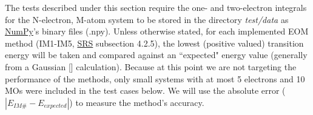 \documentclass[12pt, titlepage]{article}
\begin{document}
The tests described under this section require the one- and 
two-electron integrals for the N-electron, M-atom system to be stored in the 
directory \textit{test/data} as \href{https://numpy.org/} {NumPy}'s binary 
files (.npy). Unless otherwise 
stated, for each implemented EOM method (IM1-IM5, 
\href{https://github.com/gabrielasd/eomee/tree/cas741/docs/SRS} {SRS} 
subsection 4.2.5), the lowest (positive valued) 
transition energy will be taken and compared against an ``expected" energy 
value 
(generally from a Gaussian [\cite{g16}] calculation). 
Because at this point we are not targeting the performance of the 
methods, only small systems with at most 5 electrons and 10 MOs were included 
in the test cases below. We will use the absolute error 
($|E_{IM\#} - E_{expected}|$) to measure the method's accuracy.
\end{document}
